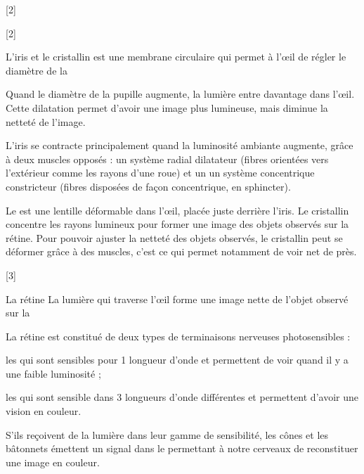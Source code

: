 [2]

[2]


\begin{doc}{L'iris et le cristallin}
   est une membrane circulaire qui permet à l’œil de régler le diamètre de la  
  
  Quand le diamètre de la pupille augmente, la lumière entre davantage dans l’œil.
  Cette dilatation permet d'avoir une image plus lumineuse, mais diminue la netteté de l'image.

  L'iris se contracte principalement quand la luminosité ambiante augmente, grâce à deux muscles opposés : un système radial dilatateur (fibres orientées vers l'extérieur comme les rayons d'une roue) et un un système concentrique constricteur (fibres disposées de façon concentrique, en sphincter).

  Le  est une lentille déformable dans l'œil, placée juste derrière l'iris.
  Le cristallin concentre les rayons lumineux pour former une image des objets observés sur la rétine.
  Pour pouvoir ajuster la netteté des objets observés, le cristallin peut se déformer grâce à des muscles, c'est ce qui permet notamment de voir net de près.
\end{doc}

[3]


\begin{doc}{La rétine}
  La lumière qui traverse l’œil forme une image nette de l'objet observé sur la 
  
  La rétine est constitué de deux types de terminaisons nerveuses photosensibles :
  \begin{listePoints}
    \item les  qui sont sensibles pour 1 longueur d'onde et permettent de voir quand il y a une faible luminosité ;
    \item les  qui sont sensible dans 3 longueurs d'onde différentes et permettent d'avoir une vision en couleur.
  \end{listePoints}
  S'ils reçoivent de la lumière dans leur gamme de sensibilité, les cônes et les bâtonnets émettent un signal dans le  permettant à notre cerveaux de reconstituer une image en couleur.
\end{doc}


